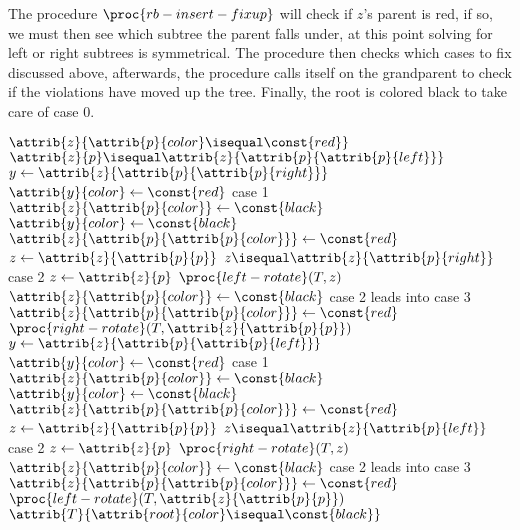 \documentclass[12pt]{article}
\begin{document}
The procedure $\proc{rb-insert-fixup}$ will check if $z$'s parent is red, if so, we must then see which subtree the parent falls under, at this point solving for left or right subtrees is symmetrical. The procedure then checks which cases to fix discussed above, afterwards, the procedure calls itself on the grandparent to check if the violations have moved up the tree. Finally, the root is colored black to take care of case 0.

\newpage

\begin{codebox}
\li \While $\attrib{z}{\attrib{p}{color} \isequal \const{red}}$
    \Do
\li     \If $\attrib{z}{p} \isequal \attrib{z}{\attrib{p}{\attrib{p}{left}}}$
\li     \Then
            $y \gets{\attrib{z}{\attrib{p}{\attrib{p}{right}}}}$
\li         \If $\attrib{y}{color} \gets{\const{red}}$ \Comment case 1
\li         \Then
                $\attrib{z}{\attrib{p}{color}} \gets{\const{black}}$
\li             $\attrib{y}{color} \gets{\const{black}}$
\li             $\attrib{z}{\attrib{p}{\attrib{p}{color}}} \gets{\const{red}}$
\li             $z \gets{\attrib{z}{\attrib{p}{p}}}$
\li         \Else
\li             \If $z \isequal \attrib{z}{\attrib{p}{right}}$ \Comment case 2
\li             \Then
                    $z \gets{\attrib{z}{p}}$
\li                 $\proc{left-rotate}(T, z)$
                \End
\li             $\attrib{z}{\attrib{p}{color}}
\gets{\const{black}}$ \Comment case 2 leads into case 3
\li             $\attrib{z}{\attrib{p}{\attrib{p}{color}}} \gets{\const{red}}$
\li             $\proc{right-rotate}(T, \attrib{z}{\attrib{p}{p}})$
            \End
\li     \Else
\li         $y \gets{\attrib{z}{\attrib{p}{\attrib{p}{left}}}}$
\li         \If $\attrib{y}{color} \gets{\const{red}}$ \Comment case 1
\li         \Then
                $\attrib{z}{\attrib{p}{color}} \gets{\const{black}}$
\li             $\attrib{y}{color} \gets{\const{black}}$
\li             $\attrib{z}{\attrib{p}{\attrib{p}{color}}} \gets{\const{red}}$
\li             $z \gets{\attrib{z}{\attrib{p}{p}}}$
\li         \Else
\li             \If $z \isequal \attrib{z}{\attrib{p}{left}}$ \Comment case 2
\li             \Then
                    $z \gets{\attrib{z}{p}}$
\li                 $\proc{right-rotate}(T, z)$
                \End
\li             $\attrib{z}{\attrib{p}{color}} \gets{\const{black}}$ \Comment case 2 leads into case 3
\li             $\attrib{z}{\attrib{p}{\attrib{p}{color}}} \gets{\const{red}}$
\li             $\proc{left-rotate}(T, \attrib{z}{\attrib{p}{p}})$
            \End
        \End
    \End
\li $\attrib{T}{\attrib{root}{color} \isequal \const{black}}$
\end{codebox}
\end{document}
